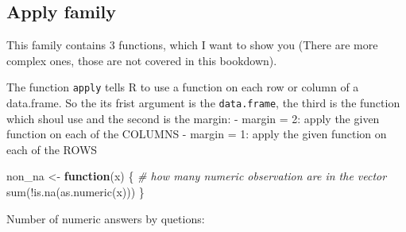 \documentclass[
]{article}
\newenvironment{Shaded}{\begin{snugshade}}{\end{snugshade}}
\newcommand{\CommentTok}[1]{\textcolor[rgb]{0.56,0.35,0.01}{\textit{#1}}}
\newcommand{\ControlFlowTok}[1]{\textcolor[rgb]{0.13,0.29,0.53}{\textbf{#1}}}
\newcommand{\FunctionTok}[1]{\textcolor[rgb]{0.00,0.00,0.00}{#1}}
\newcommand{\NormalTok}[1]{#1}
\newcommand{\OtherTok}[1]{\textcolor[rgb]{0.56,0.35,0.01}{#1}}
\newcommand{\SpecialCharTok}[1]{\textcolor[rgb]{0.00,0.00,0.00}{#1}}
\begin{document}
\hypertarget{apply-family}{%
\subsection{Apply family}\label{apply-family}}

This family contains 3 functions, which I want to show you (There are more complex ones, those are not covered in this bookdown).

The function \texttt{apply} tells R to use a function on each row or column of a data.frame. So the its frist argument is the \texttt{data.frame}, the third is the function which shoul use and the second is the margin:
- margin = 2: apply the given function on each of the COLUMNS
- margin = 1: apply the given function on each of the ROWS

\begin{Shaded}
\begin{Highlighting}[]
\NormalTok{non\_na }\OtherTok{\textless{}{-}} \ControlFlowTok{function}\NormalTok{(x) \{}
  \CommentTok{\# how many numeric observation are in the vector}
  \FunctionTok{sum}\NormalTok{(}\SpecialCharTok{!}\FunctionTok{is.na}\NormalTok{(}\FunctionTok{as.numeric}\NormalTok{(x)))}
\NormalTok{\}}
\end{Highlighting}
\end{Shaded}

Number of numeric answers by quetions:
\end{document}
